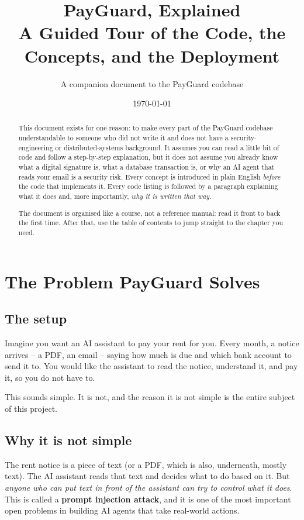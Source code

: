 \documentclass[11pt]{report}
\title{\Huge PayGuard, Explained\\[0.3em]\Large A Guided Tour of the Code, the Concepts, and the Deployment}
\author{A companion document to the PayGuard codebase}
\date{\today}
\begin{document}
\maketitle

\begin{abstract}
\noindent
This document exists for one reason: to make every part of the PayGuard
codebase understandable to someone who did not write it and does not
have a security-engineering or distributed-systems background. It assumes
you can read a little bit of code and follow a step-by-step explanation,
but it does not assume you already know what a digital signature is, what
a database transaction is, or why an AI agent that reads your email is a
security risk. Every concept is introduced in plain English \emph{before}
the code that implements it. Every code listing is followed by a
paragraph explaining what it does and, more importantly, \emph{why it is
written that way}.

The document is organised like a course, not a reference manual: read it
front to back the first time. After that, use the table of contents to
jump straight to the chapter you need.
\end{abstract}

\tableofcontents

\chapter{The Problem PayGuard Solves}
\label{ch:problem}

\section{The setup}

Imagine you want an AI assistant to pay your rent for you. Every month, a
notice arrives -- a PDF, an email -- saying how much is due and which bank
account to send it to. You would like the assistant to read the notice,
understand it, and pay it, so you do not have to.

This sounds simple. It is not, and the reason it is not simple is the
entire subject of this project.

\section{Why it is not simple}

The rent notice is a piece of text (or a PDF, which is also, underneath,
mostly text). The AI assistant reads that text and decides what to do
based on it. But \emph{anyone who can put text in front of the assistant
can try to control what it does}. This is called a \textbf{prompt
injection attack}, and it is one of the most important open problems in
building AI agents that take real-world actions.
\end{document}
